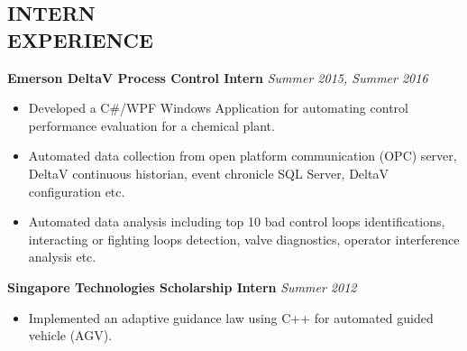 \documentclass[margin, 9pt]{res} %
\begin{document}
\begin{resume}

\section{INTERN\\ EXPERIENCE}

{\textbf{Emerson DeltaV Process Control Intern}} \hfill\textit{Summer 2015, Summer 2016}\\
\vspace*{-10pt}
\begin{itemize}[leftmargin=*] \itemsep -3pt
\vspace*{-5pt}
	\item Developed a C\#/WPF Windows Application for automating control performance evaluation for a chemical plant.
    \item Automated data collection from open platform communication (OPC) server, DeltaV continuous historian, event chronicle SQL Server,  DeltaV configuration etc.
	\item Automated data analysis including  top 10 bad control loops identifications, interacting or fighting  loops detection, valve diagnostics, operator interference analysis etc.
\end{itemize}

\medskip
{\textbf{Singapore Technologies Scholarship Intern}} \hfill\textit{Summer 2012}\\
\vspace*{-10pt}
\begin{itemize}[leftmargin=*] \itemsep -3pt
\vspace*{-5pt}
	\item Implemented an adaptive guidance law using C++ for automated guided vehicle (AGV).
\end{itemize}



\end{resume}
\end{document}
